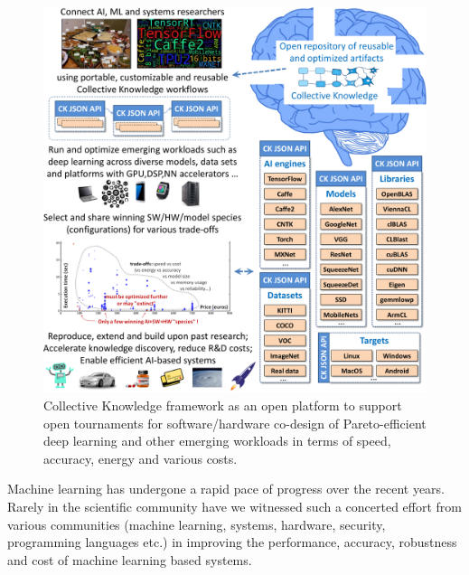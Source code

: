 \documentclass[10pt,letterpaper,twocolumn]{article}
\begin{document}
   \begin{figure}[t]
     \centering
      \includegraphics[width=4.9in]
      {ck-assets/b4b07ad3a7839327-cropped.pdf} %
     \caption{
       Collective Knowledge framework as an open platform to support open tournaments 
       for software/hardware co-design of Pareto-efficient deep learning
       and other emerging workloads in terms of speed, accuracy, energy and various costs.
     }
     \vspace{-1em}
     \label{fig:reproducible-tournaments}
   \end{figure}

Machine learning has undergone a rapid pace of progress 
over the recent years. Rarely in the scientific community have
we witnessed such a concerted effort from various communities
(machine learning, systems, hardware, security, programming
languages etc.) in improving the performance, accuracy,
robustness and cost of machine learning based systems.
\end{document}

